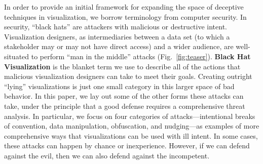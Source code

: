 \documentclass{vgtc}                          %
\begin{document}
In order to provide an initial framework for expanding the space of deceptive techniques in visualization, we borrow terminology from computer security. In security, ``black hats'' are attackers with malicious or destructive intent. Visualization designers, as intermediaries between a data set (to which a stakeholder may or may not have direct access) and a wider audience, are well-situated to perform ``man in the middle'' attacks (Fig.~\ref{fig:teaser}). \textbf{Black Hat Visualization} is the blanket term we use to describe all of the actions that malicious visualization designers can take to meet their goals. Creating outright ``lying'' visualizations is just one small category in this larger space of bad behavior. In this paper, we lay out some of the other forms these attacks can take, under the principle that a good defense requires a comprehensive threat analysis. In particular, we focus on four categories of attacks---intentional breaks of convention, data manipulation, obfuscation, and nudging---as examples of more comprehensive ways that visualizations can be used with ill intent. In some cases, these attacks can happen by chance or inexperience. However, if we can defend against the evil, then we can also defend against the incompetent.
\end{document}
